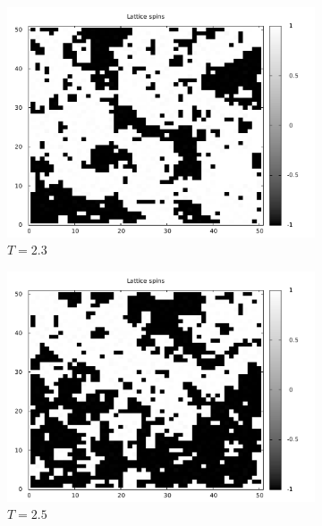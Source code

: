 \documentclass[]{article}
\begin{document}
\begin{figure}[ht!]
  \begin{subfigure}[b]{0.3\linewidth}
  \includegraphics[width=\textwidth]{figures/spin_T_eq_2p3.pdf}
  \caption{$T=2.3$}
  \label{fig:spin_t_eq_2p3}
 \end{subfigure}
 \begin{subfigure}[b]{0.3\linewidth}
  \includegraphics[width=\textwidth]{figures/spin_T_eq_2p5.pdf}
  \caption{$T=2.5$}
  \label{fig:spin_t_eq_2p5}
 \end{subfigure}
 \begin{subfigure}[b]{0.3\linewidth}

\end{subfigure}
\end{figure}
\end{document}
